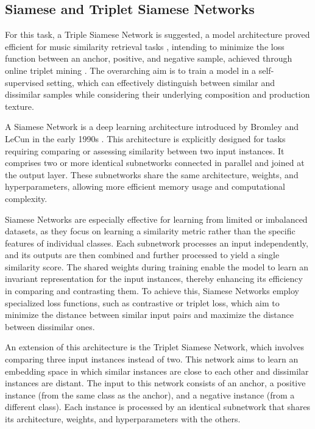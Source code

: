 \subsection{Siamese and Triplet Siamese Networks}

For this task, a Triple Siamese Network is suggested, a model architecture proved efficient for music similarity retrieval tasks \cite{contentmusicsimtriplet2020}, intending to minimize the loss function between an anchor, positive, and negative sample, achieved through online triplet mining \cite{Sikaroudi2020OfflinePatches}. The overarching aim is to train a model in a self-supervised setting, which can effectively distinguish between similar and dissimilar samples while considering their underlying composition and production texture. 

A Siamese Network is a deep learning architecture introduced by Bromley and LeCun in the early 1990s \cite{Bromley1993SignatureNetwork}. This architecture is explicitly designed for tasks requiring comparing or assessing similarity between two input instances. It comprises two or more identical subnetworks connected in parallel and joined at the output layer. These subnetworks share the same architecture, weights, and hyperparameters, allowing more efficient memory usage and computational complexity.

Siamese Networks are especially effective for learning from limited or imbalanced datasets, as they focus on learning a similarity metric rather than the specific features of individual classes. Each subnetwork processes an input independently, and its outputs are then combined and further processed to yield a single similarity score. The shared weights during training enable the model to learn an invariant representation for the input instances, thereby enhancing its efficiency in comparing and contrasting them. To achieve this, Siamese Networks employ specialized loss functions, such as contrastive or triplet loss, which aim to minimize the distance between similar input pairs and maximize the distance between dissimilar ones.

An extension of this architecture is the Triplet Siamese Network, which involves comparing three input instances instead of two. This network aims to learn an embedding space in which similar instances are close to each other and dissimilar instances are distant. The input to this network consists of an anchor, a positive instance (from the same class as the anchor), and a negative instance (from a different class). Each instance is processed by an identical subnetwork that shares its architecture, weights, and hyperparameters with the others.


